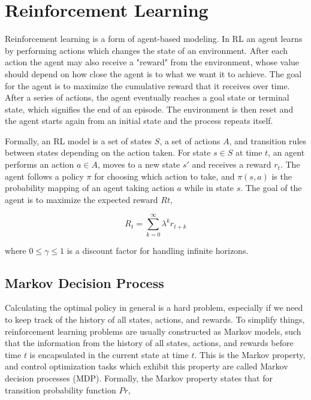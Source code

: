 \documentclass[11pt, oneside]{article}   	%
\begin{document}
\section{Reinforcement Learning}

Reinforcement learning is a form of agent-based modeling. In RL an agent learns by performing actions which changes the state of an environment. After each action the agent may also receive a "reward" from the environment, whose value should depend on how close the agent is to what we want it to achieve. The goal for the agent is to maximize the cumulative reward that it receives over time. After a series of actions, the agent eventually reaches a goal state or terminal state, which signifies the end of an episode. The environment is then reset and the agent starts again from an initial state and the process repeats itself.

\hfill

Formally, an RL model is a set of states $S$, a set of actions $A$, and transition rules between states depending on the action taken. For state $s \in S$ at time $t$, an agent performs an action $a \in A$, moves to a new state $s'$ and receives a reward $r_t$.  The agent follows a policy $\pi$ for choosing which action to take, and $\pi(s,a)$ is the probability mapping of an agent taking action $a$ while in state $s$. The goal of the agent is to maximize the expected reward $Rt$,

\begin{equation}
R_t = \sum_{k=0}^{\infty}\lambda^kr_{t+k}
\end{equation}

where $0 \leq \gamma \leq 1$ is a discount factor for handling infinite horizons.


\subsection{Markov Decision Process}

Calculating the optimal policy in general is a hard problem, especially if we need to keep track of the history of all states, actions, and rewards. To simplify things, reinforcement learning problems are usually constructed as Markov models, such that the information from the history of all states, actions, and rewards before time $t$ is encapsulated in the current state at time $t$. This is the Markov property, and control optimization tasks which exhibit this property are called Markov decision processes (MDP). Formally, the Markov property states that for transition probability function $Pr$,
\end{document}
